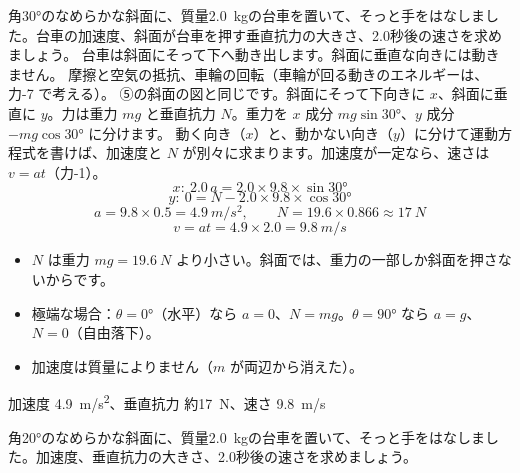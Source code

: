 \begin{phreidai}[なめらかな斜面を滑る台車]
\label{ph:力-2:ex2}角30°のなめらかな斜面に、質量\qty{2.0}{kg}の台車を置いて、そっと手をはなしました。台車の加速度、斜面が台車を押す垂直抗力の大きさ、2.0秒後の速さを求めましょう。
\phbamen
台車は斜面にそって下へ動き出します。斜面に垂直な向きには動きません。
\phmushi
摩擦と空気の抵抗、車輪の回転（車輪が回る動きのエネルギーは、力-7 で考える）。
\phzu
⑤の斜面の図と同じです。斜面にそって下向きに $x$、斜面に垂直に $y$。力は重力 $mg$ と垂直抗力 $N$。重力を $x$ 成分 $mg\sin30°$、$y$ 成分 $-mg\cos30°$ に分けます。
\phriyu
動く向き（$x$）と、動かない向き（$y$）に分けて運動方程式を書けば、加速度と $N$ が別々に求まります。加速度が一定なら、速さは $v=at$（力-1）。
\phtateru
\[ x:\ 2.0\,a=2.0\times9.8\times\sin30° \]
\[ y:\ 0=N-2.0\times9.8\times\cos30° \]
\phtoku
\[ a=9.8\times0.5=\qty{4.9}{m/s^2},\qquad N=19.6\times0.866\approx\qty{17}{N} \]
\[ v=at=4.9\times2.0=\qty{9.8}{m/s} \]
\phtashikame
\begin{itemize}[leftmargin=1.2\zw, itemsep=1pt, topsep=1pt, label={\color{bkTheme}●}]
\item $N$ は重力 $mg=\qty{19.6}{N}$ より小さい。斜面では、重力の一部しか斜面を押さないからです。
\item 極端な場合：$\theta=0°$（水平）なら $a=0$、$N=mg$。$\theta=90°$ なら $a=g$、$N=0$（自由落下）。
\item 加速度は質量によりません（$m$ が両辺から消えた）。
\end{itemize}
\kotae 加速度 \qty{4.9}{m/s^2}、垂直抗力 約\qty{17}{N}、速さ \qty{9.8}{m/s}
\end{phreidai}
\begin{jibun}
角20°のなめらかな斜面に、質量\qty{2.0}{kg}の台車を置いて、そっと手をはなしました。加速度、垂直抗力の大きさ、2.0秒後の速さを求めましょう。
\end{jibun}

